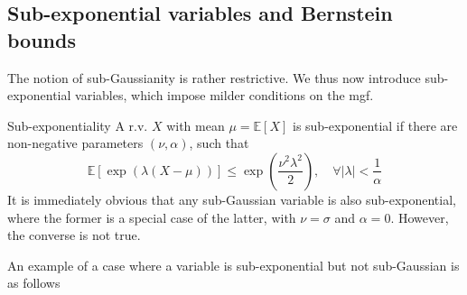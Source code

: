 \documentclass[10pt,handout,english]{beamer}
\newcommand{\E}{\mathbb{E}}
\newcommand{\1}{\mathbbm{1}}
\begin{document}
\subsection{Sub-exponential variables and Bernstein bounds}
\begin{frame}
The notion of sub-Gaussianity is rather restrictive. We thus now introduce sub-exponential variables, which impose milder conditions on the mgf.
\begin{definition}{Sub-exponentiality}
A r.v. $X$ with mean $\mu=\E[X]$ is sub-exponential if there are non-negative parameters $(\nu,\alpha)$, such that
\[
\E[\exp(\lambda(X-\mu))]\leq\exp\left(\frac{\nu^2\lambda^2}{2}\right),\quad\forall \lvert\lambda\rvert<\frac{1}{\alpha}
\]
It is immediately obvious that any sub-Gaussian variable is also sub-exponential, where the former is a special case of the latter, with $\nu=\sigma$ and $\alpha=0$. However, the converse is not true. 
\end{definition}
An example of a case where a variable is sub-exponential but not sub-Gaussian is as follows
\end{frame}
\end{document}
